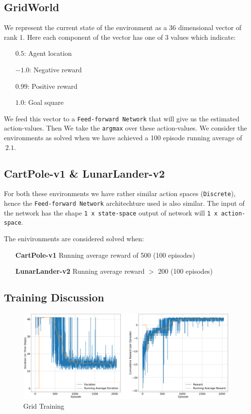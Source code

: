 \documentclass{article} %
\begin{document}
\subsection{GridWorld}

We represent the current state of the environment as a 36 dimensional vector of rank 1. Here each
component of the vector has one of 3 values which indicate:

\begin{itemize}
    \item[$0.5$:] Agent location
    \item[$-1.0$:] Negative reward
    \item[$0.99$:] Positive reward
    \item[$1.0$:] Goal square
\end{itemize}

We feed this vector to a \verb|Feed-forward Network| that will give us the estimated
action-values. Then We take the \verb|argmax| over these action-values. We consider the
environments as solved when we have achieved a 100 episode running average of $~2.1$.

\subsection{CartPole-v1 \& LunarLander-v2}
For both these environments we have rather similar action spaces (\verb|Discrete|), hence the
\verb|Feed-forward Network| architechture used is also similar. The input of the network has the shape
\verb|1 x state-space| output of network will \verb|1 x action-space|.

The enivironments are considered solved when:
\begin{itemize}
    \item[] \textbf{CartPole-v1} Running average reward of 500 (100 episodes)
    \item[] \textbf{LunarLander-v2} Running average reward $>$ 200 (100 episodes)
\end{itemize}



\subsection{Training Discussion}

\begin{figure}[H]
    \begin{center}
        \includegraphics[width=\textwidth]{grid_training_ddqn.png}
    \end{center}
    \caption{Grid Training}
\end{figure}
\end{document}
